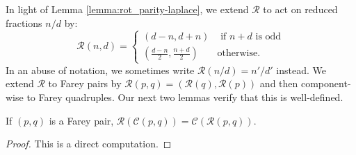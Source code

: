\documentclass[12pt]{amsart}
\begin{document}
In light of Lemma \ref{lemma:rot_parity-laplace}, we extend $\mathcal{R}$ to act on reduced fractions $n/d$ by: 
\begin{equation} \label{eq:rotation_reduced_tuples}
\mathcal{R}(n,d) = 
\begin{cases}
(d-n,d+n) &\mbox{ if $n+d$ is odd} \\
(\frac{d-n}{2},\frac{n+d}{2}) &\mbox{otherwise.}
\end{cases}
\end{equation}
In an abuse of notation, we sometimes write $\mathcal{R}(n/d) = n'/d'$ instead.
We extend $\mathcal{R}$ to Farey pairs by $\mathcal{R}(p,q) = (\mathcal{R}(q), \mathcal{R}(p))$ and then component-wise to Farey quadruples. 
Our next two lemmas verify that this is well-defined. 
\begin{lemma} \label{lemma:rot_child_commute}
	If $(p,q)$ is a Farey pair,   $\mathcal{R}(\mathcal{C}(p,q)) = \mathcal{C}(\mathcal{R}(p,q))$.
\end{lemma}
\begin{proof}
	This is a direct computation. 
\end{proof}
\end{document}
